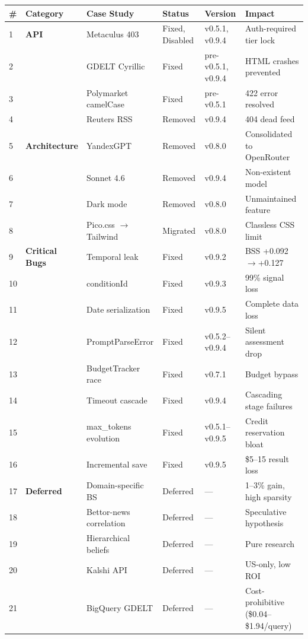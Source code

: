 \begin{table}[h]
\centering
\small
\begin{tabular}{|l|l|l|l|l|l|}
\hline
\textbf{\#} & \textbf{Category} & \textbf{Case Study} & \textbf{Status} & \textbf{Version} & \textbf{Impact} \\
\hline
1 & \textbf{API} & Metaculus 403 & Fixed, Disabled & v0.5.1, v0.9.4 & Auth-required tier lock \\
2 &  & GDELT Cyrillic & Fixed & pre-v0.5.1, v0.9.4 & HTML crashes prevented \\
3 &  & Polymarket camelCase & Fixed & pre-v0.5.1 & 422 error resolved \\
4 &  & Reuters RSS & Removed & v0.9.4 & 404 dead feed \\
\hline
5 & \textbf{Architecture} & YandexGPT & Removed & v0.8.0 & Consolidated to OpenRouter \\
6 &  & Sonnet 4.6 & Removed & v0.9.4 & Non-existent model \\
7 &  & Dark mode & Removed & v0.8.0 & Unmaintained feature \\
8 &  & Pico.css $\to$ Tailwind & Migrated & v0.8.0 & Classless CSS limit \\
\hline
9 & \textbf{Critical Bugs} & Temporal leak & Fixed & v0.9.2 & BSS +0.092$\to$+0.127 \\
10 &  & conditionId & Fixed & v0.9.3 & 99\% signal loss \\
11 &  & Date serialization & Fixed & v0.9.5 & Complete data loss \\
12 &  & PromptParseError & Fixed & v0.5.2--v0.9.4 & Silent assessment drop \\
13 &  & BudgetTracker race & Fixed & v0.7.1 & Budget bypass \\
14 &  & Timeout cascade & Fixed & v0.9.4 & Cascading stage failures \\
15 &  & max\_tokens evolution & Fixed & v0.5.1--v0.9.5 & Credit reservation bloat \\
16 &  & Incremental save & Fixed & v0.9.5 & \$5--15 result loss \\
\hline
17 & \textbf{Deferred} & Domain-specific BS & Deferred & --- & 1--3\% gain, high sparsity \\
18 &  & Bettor-news correlation & Deferred & --- & Speculative hypothesis \\
19 &  & Hierarchical beliefs & Deferred & --- & Pure research \\
20 &  & Kalshi API & Deferred & --- & US-only, low ROI \\
21 &  & BigQuery GDELT & Deferred & --- & Cost-prohibitive (\$0.04--\$1.94/query) \\
\hline
\end{tabular}
\end{table}

